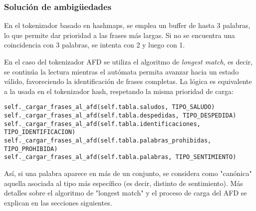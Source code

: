 \subsubsection{Solución de ambigüedades}
En el tokenizador basado en hashmaps, se emplea un buffer de hasta 3 palabras, lo que permite
dar prioridad a las frases más largas. Si no se encuentra una coincidencia con 3 palabras, se
intenta con 2 y luego con 1.

En el caso del tokenizador AFD se utiliza el algoritmo de \textit{longest match}, es decir, se
continúa la lectura mientras el autómata permita avanzar hacia un estado válido, favoreciendo
la identificación de frases completas. La lógica es equivalente a la usada en el tokenizador
hash, respetando la misma prioridad de carga:

\begin{verbatim}
self._cargar_frases_al_afd(self.tabla.saludos, TIPO_SALUDO)
self._cargar_frases_al_afd(self.tabla.despedidas, TIPO_DESPEDIDA)
self._cargar_frases_al_afd(self.tabla.identificaciones, TIPO_IDENTIFICACION)
self._cargar_frases_al_afd(self.tabla.palabras_prohibidas, TIPO_PROHIBIDA)
self._cargar_frases_al_afd(self.tabla.palabras, TIPO_SENTIMIENTO)
\end{verbatim}

Así, si una palabra aparece en más de un conjunto, se considera como "canónica" aquella
asociada al tipo más específico (es decir, distinto de sentimiento). Más detalles sobre el
algoritmo de "longest match" y el proceso de carga del AFD se explican en las secciones
siguientes.
